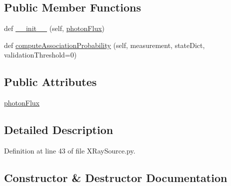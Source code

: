 \subsection*{Public Member Functions}
\begin{DoxyCompactItemize}
\item 
def \hyperlink{classmodest_1_1signals_1_1XRaySource_1_1__UniformNoiseXRaySource_a2e88b86b262f13d5e3155928043c215f}{\+\_\+\+\_\+init\+\_\+\+\_\+} (self, \hyperlink{classmodest_1_1signals_1_1XRaySource_1_1__UniformNoiseXRaySource_a67da83ce1790472638ac394018fcb410}{photon\+Flux})
\item 
def \hyperlink{classmodest_1_1signals_1_1XRaySource_1_1__UniformNoiseXRaySource_a0386156f72145ebab6b56e1a45e2a759}{compute\+Association\+Probability} (self, measurement, state\+Dict, validation\+Threshold=0)
\end{DoxyCompactItemize}
\subsection*{Public Attributes}
\begin{DoxyCompactItemize}
\item 
\hyperlink{classmodest_1_1signals_1_1XRaySource_1_1__UniformNoiseXRaySource_a67da83ce1790472638ac394018fcb410}{photon\+Flux}
\end{DoxyCompactItemize}


\subsection{Detailed Description}


Definition at line 43 of file X\+Ray\+Source.\+py.



\subsection{Constructor \& Destructor Documentation}
